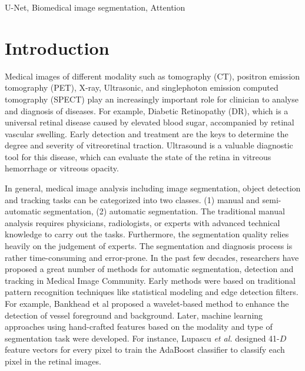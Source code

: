 \documentclass{ieeeaccess}
\begin{document}
\begin{keywords}
U-Net, Biomedical image segmentation, Attention
\end{keywords}

\titlepgskip=-15pt

\maketitle

  
  \section{Introduction}
  Medical images of different modality such as tomography (CT), positron emission tomography (PET), X-ray, Ultrasonic, and singlephoton emission computed tomography (SPECT) play an increasingly important role for clinician to analyse and diagnosis of diseases. For example, Diabetic Retinopathy (DR), which  is a universal retinal disease caused by elevated blood sugar, accompanied by retinal vascular swelling. Early detection and treatment are the keys to determine the degree and severity of vitreoretinal traction. Ultrasound is a valuable diagnostic tool for this disease, which can evaluate the state of the retina in vitreous hemorrhage or vitreous opacity.
  
  In general, medical image analysis including image segmentation, object detection and tracking tasks can be categorized into two classes. (1) manual and semi-automatic segmentation, (2) automatic segmentation.  The traditional manual analysis requires physicians, radiologists, or experts with advanced technical knowledge to carry out the tasks. Furthermore, the segmentation quality relies heavily on the judgement of experts. The segmentation and diagnosis process is rather time-consuming and error-prone. In the past few decades, researchers have proposed a great number of methods for automatic segmentation, detection and tracking in Medical Image Community. Early methods were based on traditional pattern recognition techniques like statistical modeling and edge detection filters. For example, Bankhead et al\cite{PeterNGT12} proposed a wavelet-based method to enhance the detection of vessel foreground and background. Later, machine learning approaches using hand-crafted features based on the modality and type of segmentation task were developed. For instance, Lupascu \emph{et al.} \cite{LupascuTT10} designed 41-$D$ feature vectors for every pixel to train the AdaBoost classifier to classify each pixel in the retinal images. 
  
\end{document}
